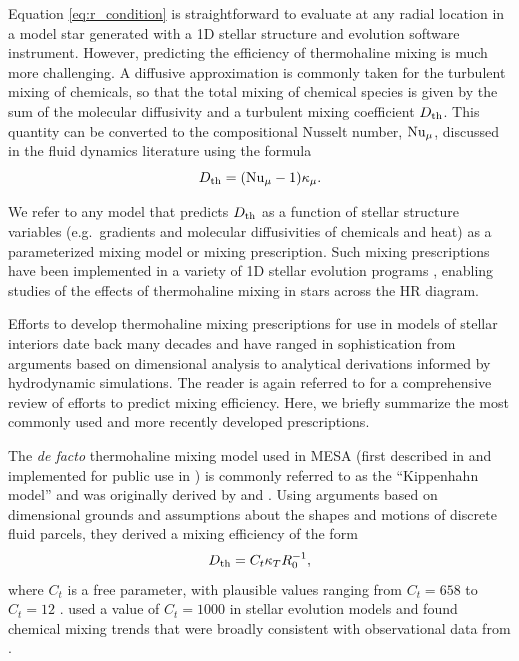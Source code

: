%
Equation \eqref{eq:r_condition} is straightforward to evaluate at any radial location in a model star generated with a 1D stellar structure and evolution software instrument. 
However, predicting the efficiency of thermohaline mixing is much more challenging. 
A diffusive approximation is commonly taken for the turbulent mixing of chemicals, so that the total mixing of chemical species is given by the sum of the molecular diffusivity and a turbulent mixing coefficient $D_\mathrm{th}$. 
This quantity can be converted to the compositional Nusselt number, $\mathrm{Nu}_\mu$, discussed in the fluid dynamics literature using the formula
\begin{equation} \label{eq:Dth_from_Nu}
    \Dth = (\Numu - 1)\kappa_\mu.
\end{equation}

We refer to any model that predicts $D_\mathrm{th}$ as a function of stellar structure variables (e.g.~gradients and molecular diffusivities of chemicals and heat) as a parameterized mixing model or mixing prescription. 
Such mixing prescriptions have been implemented in a variety of 1D stellar evolution programs \citep[see][and references therein]{lattanzio_etal_2015}, enabling studies of the effects of thermohaline mixing in stars across the HR diagram.

Efforts to develop thermohaline mixing prescriptions for use in models of stellar interiors date back many decades and have ranged in sophistication from arguments based on dimensional analysis to analytical derivations informed by hydrodynamic simulations. 
The reader is again referred to \citet{garaud_DDC_review_2018} for a comprehensive review of efforts to predict mixing efficiency. Here, we briefly summarize the most commonly used and more recently developed prescriptions.


The \textit{de facto} thermohaline mixing model used in MESA (first described in \citealt{CantielloLanger2010} and implemented for public use in \citealt{mesa2}) is commonly referred to as the ``Kippenhahn model'' and was originally derived by \citet{ulrich_1972} and \citet{kippenhahn_etal_1980}.
Using arguments based on dimensional grounds and assumptions about the shapes and motions of discrete fluid parcels, they derived a mixing efficiency of the form
\begin{equation} \label{eq:Dth-kipp}
    \Dth = C_t \kappa_T R_0^{-1},
\end{equation}
\citep[see Eq.~(5) of][]{charbonnel_thermohaline_2007}
where $C_t$ is a free parameter, with plausible values ranging from $C_t = 658$ \citep{ulrich_1972} to $C_t = 12$ \citep{kippenhahn_etal_1980}. 
\citet{charbonnel_thermohaline_2007} used a value of $C_t = 1000$ in stellar evolution models and found chemical mixing trends that were broadly consistent with observational data from \citet{Gratton2000}.

